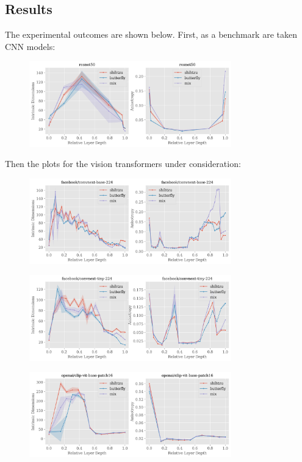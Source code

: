 \documentclass[
  11pt,
  a4paper,
  onecolumn]{article}
\begin{document}
\subsection{Results}

The experimental outcomes are shown below. First, as a benchmark are taken CNN models:
\begin{figure}[h!]
\centering
\includegraphics[width=0.78\textwidth]{figures/resnet50_topology.png}
\end{figure}

Then the plots for the vision transformers under consideration:
\begin{figure}[h!]
\centering
\includegraphics[width=0.78\textwidth]{figures/facebook-convnext-base-224_topology.png}
\end{figure}

\begin{figure}[h!]
\centering
\includegraphics[width=0.78\textwidth]{figures/facebook-convnext-tiny-224_topology.png}
\end{figure}

\begin{figure}[h!]
\centering
\includegraphics[width=0.78\textwidth]{figures/openai-clip-vit-base-patch16_topology.png}
\end{figure}
\end{document}
